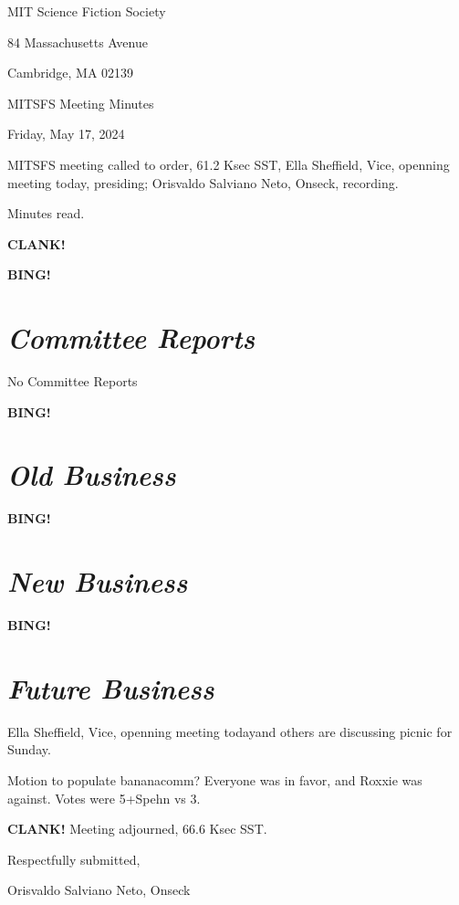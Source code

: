 \documentclass[10pt]{article}
\newcommand{\bing}{{\bf BING!} }
\newcommand{\clank}{{\bf CLANK!} }
\newcommand{\goto}[1]{\bing \vskip 12pt \section*{{\em{#1}}}}
\newcommand{\onseck}{Orisvaldo Salviano Neto, Onseck}
\newcommand{\intskinner}{Ella Sheffield, Vice, openning meeting today}
\newcommand{\meetingdate}{Friday, May 17, 2024}
\begin{document}
\begin{center}

MIT Science Fiction Society

84 Massachusetts Avenue

Cambridge, MA 02139

\vspace{12pt}

MITSFS Meeting Minutes

\meetingdate

\end{center}

\vspace{18pt}

\setlength{\parskip}{6pt}

\noindent
MITSFS meeting called to order, 61.2 Ksec SST,
\intskinner, presiding; \onseck, recording.

Minutes read.

\clank

\goto{Committee Reports}
No Committee Reports

\goto{Old Business}


\goto{New Business}


\goto{Future Business}
\intskinner and others are discussing picnic for Sunday.

Motion to populate bananacomm? Everyone was in favor, and Roxxie was against. Votes were 5+Spehn vs 3.

\clank
\noindent
Meeting adjourned, 66.6 Ksec SST.

\vspace{18pt}

\centerline{Respectfully submitted,}
\centerline{\onseck}
\end{document}
